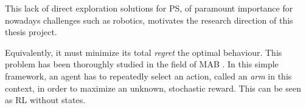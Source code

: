 This lack of direct exploration solutions for \gls{PS}, of paramount importance for nowadays challenges such as robotics, motivates the research direction of this thesis project.

Equivalently, it must minimize its total \textit{regret} \wrt the optimal behaviour. This problem has been thoroughly studied in the field of \gls{MAB} \cite{auer2002finite,lattimore2019bandit}. In this simple framework, an agent has to repeatedly select an action, called an \textit{arm} in this context, in order to maximize an unknown, stochastic reward. This can be seen as \gls{RL} without states.

